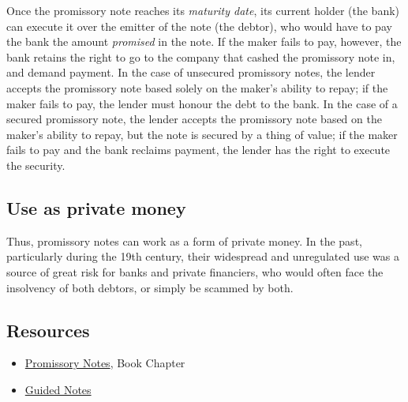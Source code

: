 Once the promissory note reaches its \textit{maturity date}, its current holder (the bank)
can execute it over the emitter of the note (the debtor), who would have to pay the bank
the amount \textit{promised} in the note. If the maker fails to pay, however, the bank
retains the right to go to the company that cashed the promissory note in, and demand
payment. In the case of unsecured promissory notes, the lender accepts the promissory note
based solely on the maker's ability to repay; if the maker fails to pay, the lender must
honour the debt to the bank. In the case of a secured promissory note, the lender accepts
the promissory note based on the maker's ability to repay, but the note is secured by a
thing of value; if the maker fails to pay and the bank reclaims payment, the lender has
the right to execute the security.




\subsection{Use as private money}
\label{sss:usea-bf82}




Thus, promissory notes can work as a form of private money. In the past, particularly
during the 19th century, their widespread and unregulated use was a source of great risk
for banks and private financiers, who would often face the insolvency of both debtors, or
simply be scammed by both.




\subsection{Resources}
\label{sss:reso-55b5}




\begin{itemize}
    \item \href{https://mathresearch.utsa.edu/wikiFiles/MAT1053/Promisory_Notes/MAT1053_M8.2Promisory_Notes.pdf}{Promissory Notes}, Book Chapter
    \item \href{https://mathresearch.utsa.edu/wikiFiles/MAT1053/Promisory_Notes/MAT1053_M8.2Promisory_NotesGN.pdf}{Guided Notes}
\end{itemize}


